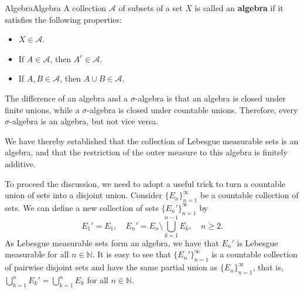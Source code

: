 \documentclass[../main.tex]{subfiles}
\begin{document}
\begin{definition}{Algebra}{Algebra}
  A collection $\mathcal{A}$ of subsets of a set $X$ is called an \textbf{algebra} if it satisfies the following properties:
  \begin{itemize}
    \item $X \in \mathcal{A}$.
    \item If $A \in \mathcal{A}$, then $A^c \in \mathcal{A}$.
    \item If $A, B \in \mathcal{A}$, then $A \cup B \in \mathcal{A}$.
  \end{itemize}
\end{definition}
\begin{remark}
  The difference of an algebra and a $\sigma$-algebra is that an algebra is closed under finite unions, while a $\sigma$-algebra is closed under countable unions. Therefore, every $\sigma$-algebra is an algebra, but not vice versa.

  We have thereby established that the collection of Lebesgue measurable sets is an algebra, and that the restriction of the outer measure to this algebra is finitely additive.
\end{remark}

To proceed the discussion, we need to adopt a useful trick to turn a countable union of sets into a disjoint union. Consider $\{E_n\}_{n=1}^{\infty}$ be a countable collection of sets. We can define a new collection of sets $\{E_n'\}_{n=1}^{\infty}$ by
\begin{equation}
  E_1' = E_1, \quad E_n' = E_n \setminus \bigcup_{k=1}^{n-1} E_k, \quad n \geq 2.
\end{equation}
As Lebesgue measurable sets form an algebra, we have that $E_n'$ is Lebesgue measurable for all $n \in \mathbb{N}$. It is easy to see that $\{E_n'\}_{n=1}^{\infty}$ is a countable collection of pairwise disjoint sets and have the same partial union as $\{E_n\}_{n=1}^{\infty}$, that is, $\bigcup_{k=1}^{n} E_k' = \bigcup_{k=1}^{n} E_k$ for all $n \in \mathbb{N}$.
\end{document}
